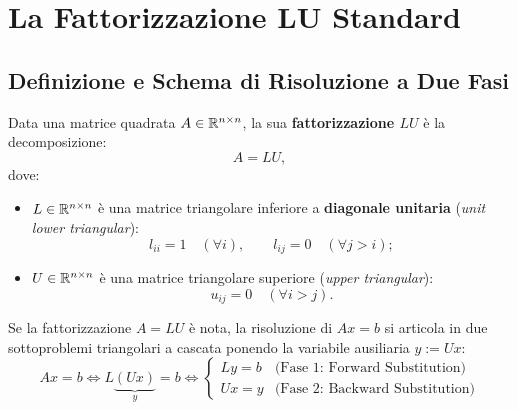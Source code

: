 \FloatBarrier
\section{La Fattorizzazione LU Standard}
\label{sec:fattorizzazione-lu-standard}

\subsection{Definizione e Schema di Risoluzione a Due Fasi}
\begin{definition}[Fattorizzazione LU]
Data una matrice quadrata $A \in \mathbb{R}^{n \times n}$, la sua \textbf{fattorizzazione $LU$} \`e la decomposizione:
\begin{equation}
    A = L U,
    \label{eq:decomposizione-lu}
\end{equation}
dove:
\begin{itemize}
    \item $L \in \mathbb{R}^{n \times n}$ \`e una matrice triangolare inferiore a \textbf{diagonale unitaria} (\textit{unit lower triangular}):
    \begin{equation}
        l_{ii} = 1 \quad (\forall i), \qquad l_{ij} = 0 \quad (\forall j > i);
    \end{equation}
    \item $U \in \mathbb{R}^{n \times n}$ \`e una matrice triangolare superiore (\textit{upper triangular}):
    \begin{equation}
        u_{ij} = 0 \quad (\forall i > j).
    \end{equation}
\end{itemize}
\end{definition}

Se la fattorizzazione $A = LU$ \`e nota, la risoluzione di $Ax = b$ si articola in due sottoproblemi triangolari a cascata ponendo la variabile ausiliaria $y := Ux$:
\begin{equation}
    A x = b \iff L \underbrace{(U x)}_{y} = b \iff
    \begin{cases}
        L y = b & \text{(Fase 1: Forward Substitution)} \\
        U x = y & \text{(Fase 2: Backward Substitution)}
    \end{cases}
    \label{eq:schema-due-fasi-lu}
\end{equation}

